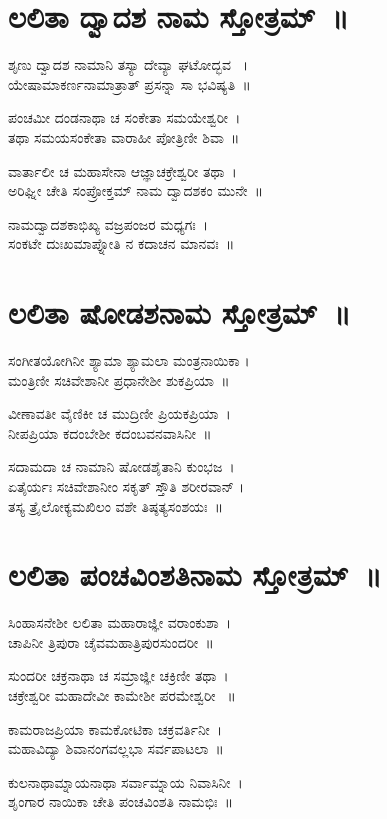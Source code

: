 \section{ಲಲಿತಾ ದ್ವಾದಶ ನಾಮ ಸ್ತೋತ್ರಮ್~॥}
ಶೃಣು ದ್ವಾದಶ ನಾಮಾನಿ ತಸ್ಯಾ ದೇವ್ಯಾ ಘಟೋದ್ಭವ ~।\\
ಯೇಷಾಮಾಕರ್ಣನಾಮಾತ್ರಾತ್ ಪ್ರಸನ್ನಾ ಸಾ ಭವಿಷ್ಯತಿ~॥

ಪಂಚಮೀ ದಂಡನಾಥಾ ಚ ಸಂಕೇತಾ ಸಮಯೇಶ್ವರೀ~।\\
ತಥಾ ಸಮಯಸಂಕೇತಾ ವಾರಾಹೀ ಪೋತ್ರಿಣೀ ಶಿವಾ~॥

ವಾರ್ತಾಲೀ ಚ ಮಹಾಸೇನಾ ಆಜ್ಞಾಚಕ್ರೇಶ್ವರೀ ತಥಾ~।\\
ಅರಿಘ್ನೀ ಚೇತಿ ಸಂಪ್ರೋಕ್ತಮ್ ನಾಮ ದ್ವಾದಶಕಂ ಮುನೇ~॥

ನಾಮದ್ವಾದಶಕಾಭಿಖ್ಯ ವಜ್ರಪಂಜರ ಮಧ್ಯಗಃ~।\\
ಸಂಕಟೇ ದುಃಖಮಾಪ್ನೋತಿ ನ ಕದಾಚನ ಮಾನವಃ~॥
\section{ಲಲಿತಾ ಷೋಡಶನಾಮ ಸ್ತೋತ್ರಮ್~॥}
ಸಂಗೀತಯೋಗಿನೀ ಶ್ಯಾಮಾ ಶ್ಯಾಮಲಾ ಮಂತ್ರನಾಯಿಕಾ ।\\
ಮಂತ್ರಿಣೀ ಸಚಿವೇಶಾನೀ ಪ್ರಧಾನೇಶೀ ಶುಕಪ್ರಿಯಾ~॥

ವೀಣಾವತೀ ವೈಣಿಕೀ ಚ ಮುದ್ರಿಣೀ ಪ್ರಿಯಕಪ್ರಿಯಾ~।\\
ನೀಪಪ್ರಿಯಾ ಕದಂಬೇಶೀ ಕದಂಬವನವಾಸಿನೀ~॥

ಸದಾಮದಾ ಚ ನಾಮಾನಿ ಷೋಡಶೈತಾನಿ ಕುಂಭಜ~।\\
ಏತೈರ್ಯಃ ಸಚಿವೇಶಾನೀಂ ಸಕೃತ್ ಸ್ತೌತಿ ಶರೀರವಾನ್ ।\\
ತಸ್ಯ ತ್ರೈಲೋಕ್ಯಮಖಿಲಂ ವಶೇ ತಿಷ್ಠತ್ಯಸಂಶಯಃ~॥
\section{ಲಲಿತಾ ಪಂಚವಿಂಶತಿನಾಮ ಸ್ತೋತ್ರಮ್~॥}
ಸಿಂಹಾಸನೇಶೀ ಲಲಿತಾ ಮಹಾರಾಜ್ಞೀ ವರಾಂಕುಶಾ~।\\
ಚಾಪಿನೀ ತ್ರಿಪುರಾ ಚೈವಮಹಾತ್ರಿಪುರಸುಂದರೀ~॥

ಸುಂದರೀ ಚಕ್ರನಾಥಾ ಚ ಸಮ್ರಾಜ್ಞೀ ಚಕ್ರಿಣೀ ತಥಾ~।\\
ಚಕ್ರೇಶ್ವರೀ ಮಹಾದೇವೀ ಕಾಮೇಶೀ ಪರಮೇಶ್ವರೀ ~॥

ಕಾಮರಾಜಪ್ರಿಯಾ ಕಾಮಕೋಟಿಕಾ ಚಕ್ರವರ್ತಿನೀ~।\\
ಮಹಾವಿದ್ಯಾ ಶಿವಾನಂಗವಲ್ಲಭಾ ಸರ್ವಪಾಟಲಾ~॥

ಕುಲನಾಥಾಮ್ನಾಯನಾಥಾ ಸರ್ವಾಮ್ನಾಯ ನಿವಾಸಿನೀ~।\\
ಶೃಂಗಾರ ನಾಯಿಕಾ ಚೇತಿ ಪಂಚವಿಂಶತಿ ನಾಮಭಿಃ~॥

